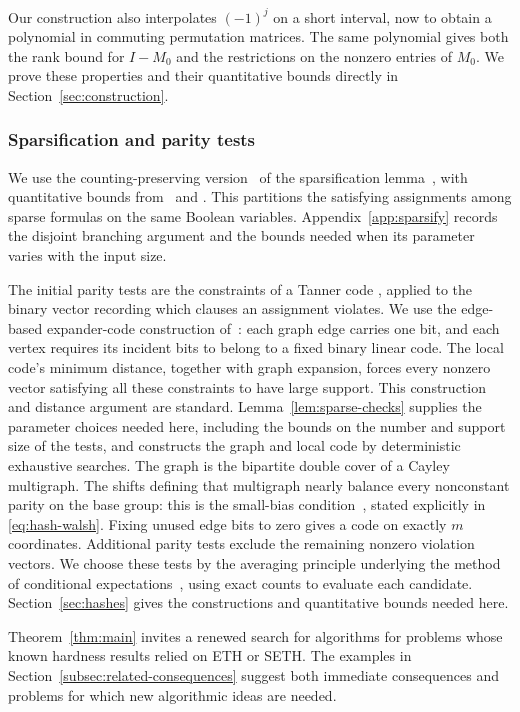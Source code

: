 \documentclass[11pt,reqno]{amsart}
\numberwithin{equation}{section}
\theoremstyle{definition}\newtheorem{definition}[theorem]{Definition}
\theoremstyle{remark}\newtheorem{remark}[theorem]{Remark}
\begin{document}
Our construction also interpolates $(-1)^j$ on a short interval, now
to obtain a polynomial in commuting permutation matrices. The same
polynomial gives both the rank bound for $I-M_0$ and the restrictions
on the nonzero entries of $M_0$. We prove these properties and their
quantitative bounds directly in Section~\ref{sec:construction}.

\subsubsection{Sparsification and parity tests}\label{subsec:related-reductions}
We use the counting-preserving version~\cite[Appendix~A]{DHMTW} of
the sparsification lemma~\cite{IPZ}, with quantitative bounds
from~\cite[Section~6]{CIP} and
\cite[Lemma~5.14 and equation~(5.4)]{CalabroThesis}.
This partitions the satisfying assignments among sparse formulas on
the same Boolean variables. Appendix~\ref{app:sparsify} records the
disjoint branching argument and the bounds needed when its parameter
varies with the input size.

The initial parity tests are the constraints of a Tanner code
\cite[Section~II]{Tanner81}, applied to the binary vector recording
which clauses an assignment violates. We use the edge-based
expander-code construction of~\cite[Sections~IV and~VI]{SS96}:
each graph edge carries one bit, and each vertex requires its
incident bits to belong to a fixed binary linear code. The local
code's minimum distance, together with graph expansion, forces
every nonzero vector satisfying all these constraints to have
large support. This construction and distance argument are standard.
Lemma~\ref{lem:sparse-checks} supplies the parameter choices needed
here, including the bounds on the number and support size of the
tests, and constructs the graph and local code by deterministic
exhaustive searches. The graph is the bipartite double cover of a Cayley multigraph.
The shifts defining that multigraph nearly balance every nonconstant
parity on the base group: this is
the small-bias condition~\cite{NN93,AR94}, stated explicitly in
\eqref{eq:hash-walsh}. Fixing unused edge bits to zero gives a code
on exactly $m$ coordinates.
Additional parity tests exclude the remaining nonzero violation
vectors. We choose these tests by the
averaging principle underlying the method of conditional
expectations~\cite{Raghavan88}, using exact counts to evaluate each
candidate. Section~\ref{sec:hashes} gives the constructions and
quantitative bounds needed here.

Theorem~\ref{thm:main} invites a renewed search for algorithms for
problems whose known hardness results relied on ETH or SETH. The
examples in Section~\ref{subsec:related-consequences} suggest both
immediate consequences and problems for which new algorithmic ideas
are needed.
\end{document}
